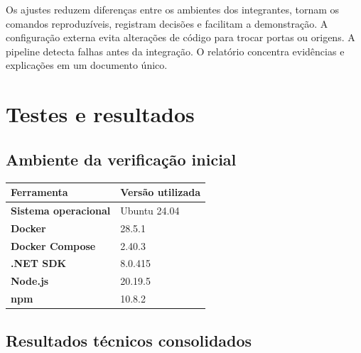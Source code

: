 \documentclass[12pt,a4paper,openany]{report}
\begin{document}
Os ajustes reduzem diferenças entre os ambientes dos integrantes, tornam os comandos reproduzíveis, registram decisões e facilitam a demonstração. A configuração externa evita alterações de código para trocar portas ou origens. A pipeline detecta falhas antes da integração. O relatório concentra evidências e explicações em um documento único.

\chapter{Testes e resultados}

\section{Ambiente da verificação inicial}

\begin{tabularx}{\textwidth}{>{\bfseries}p{} X}
\toprule
Ferramenta & Versão utilizada \\
\midrule
Sistema operacional & Ubuntu 24.04 \\
Docker & 28.5.1 \\
Docker Compose & 2.40.3 \\
.NET SDK & 8.0.415 \\
Node.js & 20.19.5 \\
npm & 10.8.2 \\
\bottomrule
\end{tabularx}

\section{Resultados técnicos consolidados}
\end{document}
